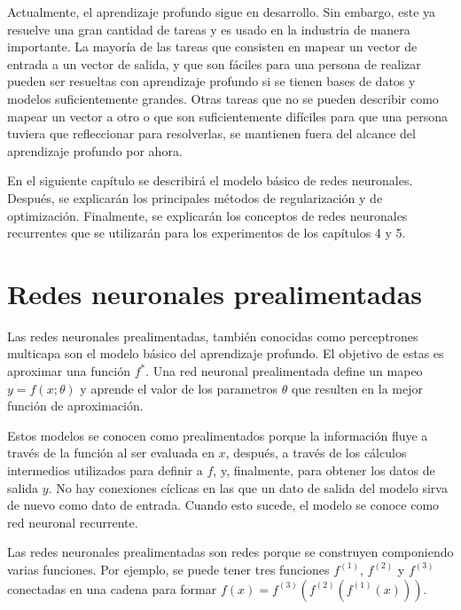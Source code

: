 \vspace{1em}

Actualmente, el aprendizaje profundo sigue en desarrollo. Sin embargo, este ya resuelve una gran cantidad de tareas y es usado en la industria de manera importante. La mayoría de las tareas que consisten en mapear un vector de entrada a un vector de salida, y que son fáciles para una persona de realizar pueden ser resueltas con aprendizaje profundo si se tienen bases de datos y modelos suficientemente grandes. Otras tareas que no se pueden describir como mapear un vector a otro o que son suficientemente difíciles para que una persona tuviera que refleccionar para resolverlas, se mantienen fuera del alcance del aprendizaje profundo por ahora.
\cite{goodfellow-et-al-2016}

\vspace{1em}

En el siguiente capítulo se describirá el modelo básico de redes neuronales. Después, se explicarán los principales métodos de regularización y de optimización. Finalmente, se explicarán los conceptos de redes neuronales recurrentes que se utilizarán para los experimentos de los capítulos 4 y 5.

\section{Redes neuronales prealimentadas}
Las redes neuronales prealimentadas, también conocidas como perceptrones multicapa son el modelo básico del aprendizaje profundo. El objetivo de estas es aproximar una función $f^*$. Una red neuronal prealimentada define un mapeo $y = f(x;\theta)$ y aprende el valor de los parametros $\theta$ que resulten en la mejor función de aproximación. 

\vspace{1em}

Estos modelos se conocen como prealimentados porque la información fluye a través de la función al ser evaluada en $x$, después, a través de los cálculos intermedios utilizados para definir a $f$, y, finalmente, para obtener los datos de salida $y$. No hay conexiones cíclicas en las que un dato de salida del modelo sirva de nuevo como dato de entrada. Cuando esto sucede, el modelo se conoce como red neuronal recurrente.

\vspace{1em}

Las redes neuronales prealimentadas son redes porque se construyen componiendo varias funciones. Por ejemplo, se puede tener tres funciones $f^{(1)}$, $f^{(2)}$ y $f^{(3)}$ conectadas en una cadena para formar $f(x) = f^{(3)}(f^{(2)}(f^{(1)}(x)))$.


